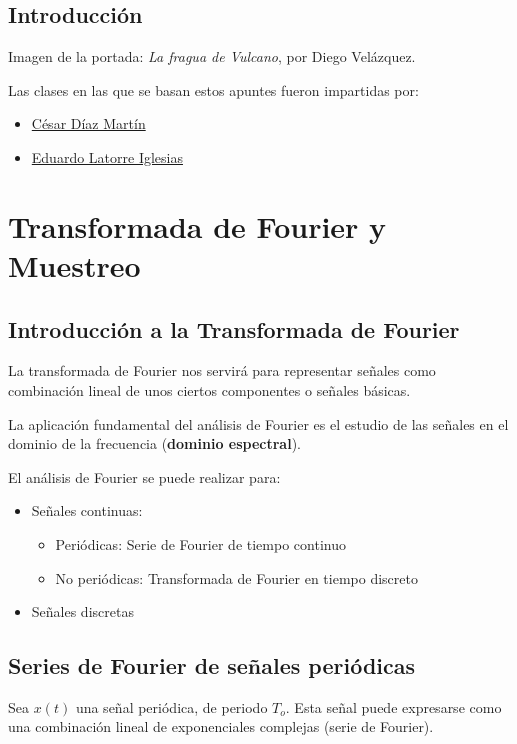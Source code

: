 \documentclass[a4paper]{book}
\begin{document}
\newpage
{}
{}
\section*{Introducción}
Imagen de la portada: \textsl{La fragua de Vulcano}, por Diego Velázquez.

Las clases en las que se basan estos apuntes fueron impartidas por:
\begin{itemize}
	\item  \href{mailto:cesar.diazm@upm.es}{César Díaz Martín}
	\item \href{mailto:eduardo.latorre.iglesias@upm.es}{Eduardo Latorre Iglesias}
\end{itemize}

\newpage

\setlength{\parskip}{0em}
\tableofcontents
\setlength{\parskip}{0.5em}


\chapter{Transformada de Fourier y Muestreo}

\section{Introducción a la Transformada de Fourier}

La transformada de Fourier nos servirá para representar señales como combinación lineal de unos ciertos componentes o señales básicas.

La aplicación fundamental del análisis de Fourier es el estudio de las señales en el dominio de la frecuencia (\textbf{dominio espectral}).

El análisis de Fourier se puede realizar para:
\begin{itemize}
	\item Señales continuas:
	      \begin{itemize}
		      \item Periódicas: Serie de Fourier de tiempo continuo
		      \item No periódicas: Transformada de Fourier en tiempo discreto
	      \end{itemize}
	\item Señales discretas
\end{itemize}

\section{Series de Fourier de señales periódicas}
Sea $x(t)$ una señal periódica, de periodo $T_o$. Esta señal puede expresarse como una combinación lineal de exponenciales complejas (serie de Fourier).
\end{document}
